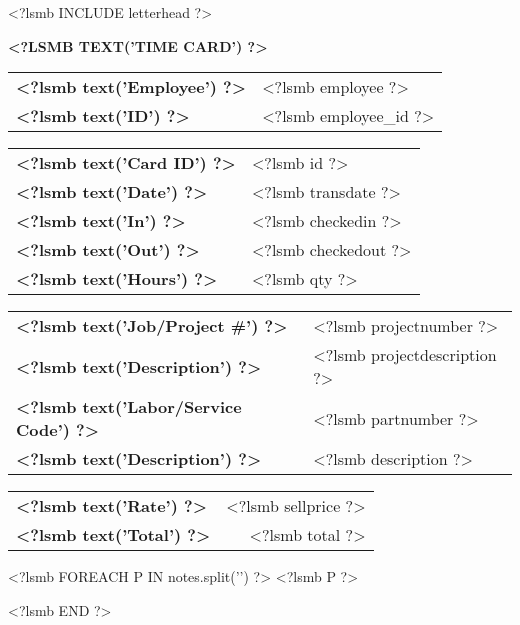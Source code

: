 \documentclass{scrartcl}
\begin{document}
\pagestyle{myheadings}
\thispagestyle{empty}

<?lsmb INCLUDE letterhead ?>

\centerline{\textbf{\MakeUppercase{<?lsmb text('Time Card') ?>}}}

\vspace*{0.5cm}

\begin{tabular}[t]{ll}
  \textbf{<?lsmb text('Employee') ?>} & <?lsmb employee ?> \\
  \textbf{<?lsmb text('ID') ?>} & <?lsmb employee_id ?> \\
\end{tabular}
\hfill
\begin{tabular}[t]{ll}
  \textbf{<?lsmb text('Card ID') ?>} & <?lsmb id ?> \\
  \textbf{<?lsmb text('Date') ?>} & <?lsmb transdate ?> \\
  \textbf{<?lsmb text('In') ?>} & <?lsmb checkedin ?> \\
  \textbf{<?lsmb text('Out') ?>} & <?lsmb checkedout ?> \\
  \textbf{<?lsmb text('Hours') ?>} & <?lsmb qty ?> \\
\end{tabular}

\vspace{1cm}

\begin{tabular}[b]{ll}
  \textbf{<?lsmb text('Job/Project #') ?>} & <?lsmb projectnumber ?> \\
  \textbf{<?lsmb text('Description') ?>} & <?lsmb projectdescription ?> \\
  \textbf{<?lsmb text('Labor/Service Code') ?>} & <?lsmb partnumber ?> \\
  \textbf{<?lsmb text('Description') ?>} & <?lsmb description ?> \\
\end{tabular}
\hfill
\begin{tabular}[b]{lr}
  \textbf{<?lsmb text('Rate') ?>} & <?lsmb sellprice ?> \\
  \textbf{<?lsmb text('Total') ?>} & <?lsmb total ?> \\
\end{tabular}
  
\vspace{0.3cm}

<?lsmb FOREACH P IN notes.split('\n\n') ?>
<?lsmb P ?>\medskip

<?lsmb END ?>
 
\end{document}
